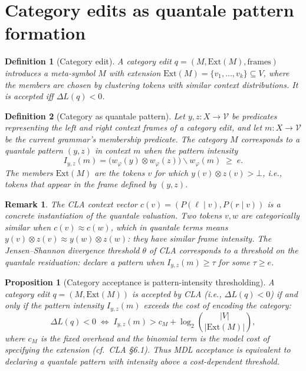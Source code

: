 \documentclass[11pt]{article}
\newtheorem{definition}{Definition}
\newtheorem{proposition}{Proposition}
\newtheorem{remark}{Remark}
\begin{document}
\section{Category edits as quantale pattern formation}

\begin{definition}[Category edit]
\label{def:category-edit}
A \emph{category edit} $q = (M, \text{Ext}(M), \text{frames})$ introduces a meta-symbol $M$ with extension $\text{Ext}(M) = \{v_1, \ldots, v_k\} \subseteq V$, where the members are chosen by clustering tokens with similar context distributions.  It is accepted iff $\Delta L(q) < 0$.
\end{definition}

\begin{definition}[Category as quantale pattern]
\label{def:category-pattern}
Let $y, z : X \to \mathcal{V}$ be predicates representing the left and right context frames of a category edit, and let $m : X \to \mathcal{V}$ be the current grammar's membership predicate.  The category $M$ corresponds to a \emph{quantale pattern} $(y, z)$ in context $m$ when the pattern intensity
\[
  I_{y,z}(m) = \bigl(w_\varphi(y) \otimes w_\varphi(z)\bigr) \backslash w_\varphi(m) \;\geq\; e.
\]
The members $\text{Ext}(M)$ are the tokens $v$ for which $y(v) \otimes z(v) > \bot$, i.e., tokens that appear in the frame defined by $(y, z)$.
\end{definition}

\begin{remark}
The CLA context vector $c(v) = (P(\ell \mid v), P(r \mid v))$ is a concrete instantiation of the quantale valuation.  Two tokens $v, w$ are categorically similar when $c(v) \approx c(w)$, which in quantale terms means $y(v) \otimes z(v) \approx y(w) \otimes z(w)$: they have similar frame intensity.  The Jensen--Shannon divergence threshold $\theta$ of CLA corresponds to a threshold on the quantale residuation: declare a pattern when $I_{y,z}(m) \geq \tau$ for some $\tau \geq e$.
\end{remark}

\begin{proposition}[Category acceptance is pattern-intensity thresholding]
\label{prop:category-pattern}
A category edit $q = (M, \text{Ext}(M))$ is accepted by CLA (i.e., $\Delta L(q) < 0$) if and only if the pattern intensity $I_{y,z}(m)$ exceeds the cost of encoding the category:
\[
  \Delta L(q) < 0 \;\iff\; I_{y,z}(m) > c_M + \log_2 \binom{|V|}{|\text{Ext}(M)|},
\]
where $c_M$ is the fixed overhead and the binomial term is the model cost of specifying the extension (cf.\ CLA \S 6.1).  Thus MDL acceptance is equivalent to declaring a quantale pattern with intensity above a cost-dependent threshold.
\end{proposition}
\end{document}
